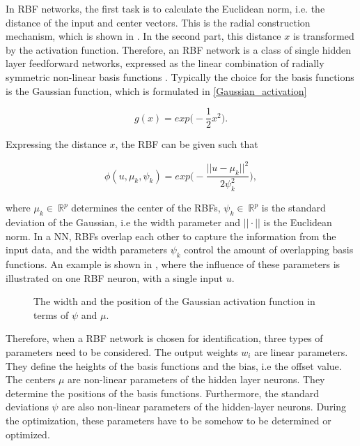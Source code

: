  In RBF networks, the first task is to calculate the Euclidean norm, i.e. the distance of the input and center vectors. This is the radial construction mechanism, which is shown in . In the second part, this distance $x$ is transformed by the activation function. Therefore, an RBF network is a class of single hidden layer feedforward networks, expressed as the linear combination of radially symmetric non-linear basis functions \cite{RBF_article}. Typically the choice for the basis functions is the Gaussian function, which is formulated in \eqref{Gaussian_activation} 

\begin{equation}
\label{Gaussian_activation}
g(x) = exp \Big(-\frac{1}{2}x^2\Big).
\end{equation}

Expressing the distance $x$, the RBF can be given such that

 \begin{equation}
\label{Gaussian_activation1}
\phi(u,\mu_k, \psi_k) = exp \Big(-\frac{||u-\mu_k||^2}{2\psi_k^2}\Big), 
\end{equation}

where $\mu_k \in \: \mathbb{R}^{p}$ determines the center of the RBFs, $\psi_k \in \: \mathbb{R}^{p}$ is the standard deviation of the Gaussian, i.e the width parameter and $||\cdot||$ is the Euclidean norm. In a NN, RBFs overlap each other to capture the information from the input data, and the width parameters $\psi_k$ control the amount of overlapping basis functions. An example is shown in , where the influence of these parameters is illustrated on one RBF neuron, with a single input $u$. 

\begin{figure}[H]
\centering
 
\caption{The width and the position of the Gaussian activation function in terms of $\psi$ and $\mu$.}
\label{fig:rbf_pram}
\end{figure}

\vspace{-3mm}

Therefore, when a RBF network is chosen for identification, three types of parameters need to be considered. The output weights $w_i$ are linear parameters. They define the heights of the basis functions and the bias, i.e the offset value. The centers $\mu$ are non-linear parameters of the hidden layer neurons. They determine the positions of the basis functions. Furthermore, the standard deviations $\psi$ are also non-linear parameters of the hidden-layer neurons. During the optimization, these parameters have to be somehow to be determined or optimized. 